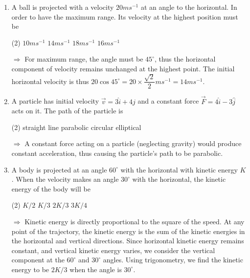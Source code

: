 \documentclass{article}
\renewcommand{\frac}[2]{\dfrac{#1}{#2}}
\newenvironment{solution}{\par\noindent\color{red!85!black}$\Rightarrow$\vspace{0em}}{}
\begin{document}
\begin{enumerate}
    \item A ball is projected with a velocity $20 ms^{-1}$ at an angle to the horizontal. In order to have the maximum range. Its velocity at the highest position must be
        \begin{tasks}(2)
            \task $10 ms^{-1}$
            \task $14 ms^{-1}$
            \task $18 ms^{-1}$
            \task $16 ms^{-1}$\ans
        \end{tasks}
    \begin{solution}
        For maximum range, the angle must be $45^\circ$, thus the horizontal component of velocity remains unchanged at the highest point. The initial horizontal velocity is thus $20\cos{45^\circ} = 20 \times \frac{\sqrt{2}}{2} ms^{-1}= 14 ms^{-1}$.
    \end{solution}
    
    \item A particle has initial velocity $\vec{v} = 3\hat{i} + 4\hat{j}$ and a constant force $\vec{F} = 4\hat{i} - 3\hat{j}$ acts on it. The path of the particle is
        \begin{tasks}(2)
            \task straight line
            \task parabolic\ans
            \task circular
            \task elliptical
        \end{tasks}
    \begin{solution}
        A constant force acting on a particle (neglecting gravity) would produce constant acceleration, thus causing the particle's path to be parabolic.
    \end{solution}
    
    \item A body is projected at an angle $60^\circ$ with the horizontal with kinetic energy $K$. When the velocity makes an angle $30^\circ$ with the horizontal, the kinetic energy of the body will be
        \begin{tasks}(2)
            \task $K/2$
            \task $K/3$
            \task $2K/3$\ans
            \task $3K/4$
        \end{tasks}
    \begin{solution}
        Kinetic energy is directly proportional to the square of the speed. At any point of the trajectory, the kinetic energy is the sum of the kinetic energies in the horizontal and vertical directions. Since horizontal kinetic energy remains constant, and vertical kinetic energy varies, we consider the vertical component at the $60^\circ$ and $30^\circ$ angles. Using trigonometry, we find the kinetic energy to be $2K/3$ when the angle is $30^\circ$.
    \end{solution}
    

\end{enumerate}
\end{document}
